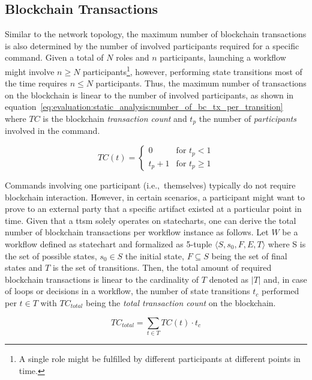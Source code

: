 \subsection{Blockchain Transactions}
\label{sec:evaluation:static_analysis:blockchain_transactions}
Similar to the network topology, the maximum number of blockchain transactions is also determined by the number of involved participants required for a specific command. Given a total of $N$ roles and $n$ participants, launching a workflow might involve $n \geq N$ participants\footnote{A single role might be fulfilled by different participants at different points in time.}, however, performing state transitions most of the time requires $n \leq N$ participants. Thus, the maximum number of transactions on the blockchain is linear to the number of involved participants, as shown in equation~\ref{eq:evaluation:static_analysis:number_of_bc_tx_per_transition} where $TC$ is the blockchain \textit{transaction count} and $t_p$ the number of \textit{participants} involved in the command.

\begin{equation}
\label{eq:evaluation:static_analysis:number_of_bc_tx_per_transition}
TC(t) = \begin{cases}
            0 & \text{for $t_p < 1$} \\
            t_p + 1 & \text{for $t_p \geq 1$}
        \end{cases}
\end{equation}

Commands involving one participant (i.e.,\ themselves) typically do not require blockchain interaction. However, in certain scenarios, a participant might want to prove to an external party that a specific artifact existed at a particular point in time. Given that a \gls{ttsm} solely operates on statecharts, one can derive the total number of blockchain transactions per workflow instance as follows. Let $W$ be a workflow defined as statechart and formalized as 5-tuple $\langle S, s_0, F, E, T \rangle$ where S is the set of possible states, $s_0 \in S$ the initial state, $F \subseteq S$ being the set of final states and $T$ is the set of transitions. Then, the total amount of required blockchain transactions is linear to the cardinality of $T$ denoted as $|T|$ and, in case of loops or decisions in a workflow, the number of state transitions $t_c$ performed per $t \in T$ with $TC_{total}$ being the \textit{total transaction count} on the blockchain.

\begin{equation}
\label{eq:evaluation:static_analysis:total_number_of_bc_tx_per_bp}
TC_{total} = \sum_{t \in T} TC(t) \cdot t_c
\end{equation}

